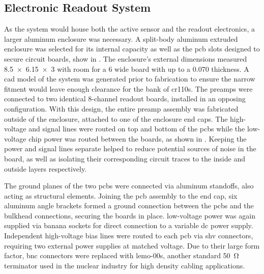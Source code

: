 \documentclass[../../../main.tex]{subfiles}%
\begin{document}
%
    \subsection{Electronic Readout System}%
    \label{sec:chapter-3:multi-channel-system:electronic-readout}%
    As the system would house both the active sensor and the readout electronics, a larger aluminum enclosure was necessary.
    A split-body aluminum extruded enclosure was selected for its internal capacity as well as the \gls{pcb} slots designed to secure circuit boards, show in .
    The enclosure's external dimensions measured \SI{8.5 x 6.15 x 3}{\inch} with room for a \SI{6}{\inch} wide board with up to a \SI{0.070}{\inch} thickness.
    A \gls{cad} model of the system was generated prior to fabrication to ensure the narrow fitment would leave enough clearance for the bank of \glspl{cr110}.
    The \glspl{preamp} were connected to two identical 8-channel readout boards, installed in an opposing configuration.
    With this design, the entire \gls{preamp} assembly was fabricated outside of the enclosure, attached to one of the enclosure end caps.
    The \gls{high-voltage} and signal lines were routed on top and bottom of the \glspl{pcb} while the \gls{low-voltage} chip power was routed between the boards, as shown in .
    Keeping the power and signal lines separate helped to reduce potential sources of noise in the board, as well as isolating their corresponding circuit traces to the inside and outside layers respectively.
    \par%
    The ground planes of the two \glspl{pcb} were connected via aluminum standoffs, also acting as structural elements.
    Joining the \gls{pcb} assembly to the end cap, six aluminum angle brackets formed a ground connection between the \glspl{pcb} and the bulkhead connections, securing the boards in place.
    \Gls{low-voltage} power was again supplied via banana sockets for direct connection to a variable \gls{dc} power supply.
    Independent \gls{high-voltage} bias lines were routed to each \gls{pcb} via \gls{shv} connectors, requiring two external power supplies at matched voltage.
    Due to their large form factor, \gls{bnc} connectors were replaced with \glspl{lemo-00}, another standard \SI{50}{\ohm} terminator used in the nuclear industry for high density cabling applications.
\end{document}
